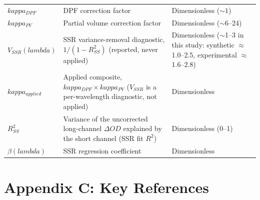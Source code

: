 \documentclass[12pt]{article}
\def\kappa{kappa}%
\def\lambda{lambda}%
\def\mathrm#1{#1}%
\def\text#1{#1}%
\begin{document}
\begin{center}
\begin{tabular}{@{}l >{\raggedright\arraybackslash}p{5.0cm} >{\raggedright\arraybackslash}p{6.0cm}@{}}
\hline
$\kappa_{\text{DPF}}$ & DPF correction factor & Dimensionless ($\sim 1$) \\
$\kappa_{\text{PV}}$ & Partial volume correction factor & Dimensionless ($\sim$6--24) \\
$V_{\mathrm{SSR}}(\lambda)$ & SSR variance-removal diagnostic, $1/(1-R^2_{\mathrm{SS}})$ (reported, never applied) & Dimensionless ($\sim$1--3 in this study: synthetic $\approx$1.0--2.5, experimental $\approx$1.6--2.8) \\
$\kappa_{\text{applied}}$ & Applied composite, $\kappa_{\text{DPF}}\times\kappa_{\text{PV}}$ ($V_{\mathrm{SSR}}$ is a per-wavelength diagnostic, not applied) & Dimensionless \\
\hline
$R^2_{\mathrm{SS}}$ & Variance of the uncorrected long-channel $\Delta\mathrm{OD}$ explained by the short channel (SSR fit $R^2$) & Dimensionless (0--1) \\
$\beta(\lambda)$ & SSR regression coefficient & Dimensionless \\
\hline
\end{tabular}
\end{center}

\section{Appendix C: Key References}
\end{document}
